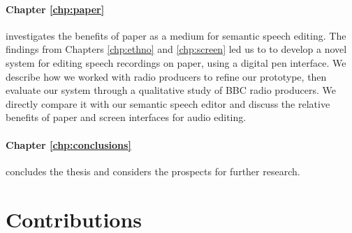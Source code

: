 \paragraph{Chapter \ref{chp:paper}} investigates the benefits of paper as a medium for semantic speech editing.  The
findings from Chapters \ref{chp:ethno} and \ref{chp:screen} led us to to develop a novel system for editing speech
recordings on paper, using a digital pen interface. We describe how we worked with radio producers to refine our
prototype, then evaluate our system through a qualitative study of BBC radio producers. We directly compare it with our
semantic speech editor and discuss the relative benefits of paper and screen interfaces for audio editing.

\paragraph{Chapter \ref{chp:conclusions}} concludes the thesis and considers the prospects for further research.

\section{Contributions}\label{sec:intro-contributions}






